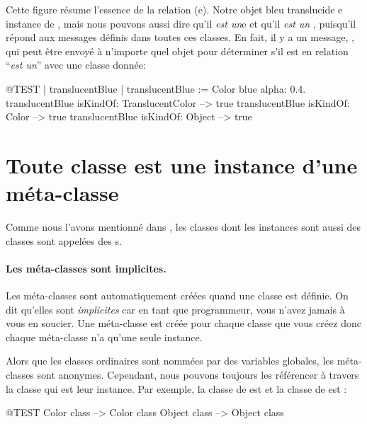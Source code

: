 \documentclass[a4paper,10pt,twoside]{book}
\begin{document}
Cette figure résume l'essence de la relation (e).
Notre objet bleu translucide e instance de
, mais nous pouvons aussi dire qu'il
\emph{est un}{}e   et qu'il \emph{est un} , puisqu'il répond aux messages définis dans toutes ces classes.
En fait, il y a un message, , qui peut être envoyé à n'importe quel objet pour déterminer s'il est en relation ``\emph{est un}'' avec une classe donnée:

\begin{code}{@TEST | translucentBlue |}
translucentBlue := Color blue alpha: 0.4.
translucentBlue isKindOf: TranslucentColor --> true
translucentBlue isKindOf: Color                    --> true
translucentBlue isKindOf: Object                  --> true
\end{code}

\section{Toute classe est une instance d'une méta-classe}


Comme nous l'avons mentionné dans , les classes dont les instances sont aussi des classes sont appelées des s.

\paragraph{Les méta-classes sont implicites.}
Les méta-classes sont automatiquement créées quand une classe est définie.
On dit qu'elles sont \emph{implicites} car en tant que programmeur, vous n'avez jamais à vous en soucier.
Une méta-classe  est créée pour chaque classe que vous créez donc chaque méta-classe n'a qu'une seule instance.

Alors que les classes ordinaires sont nommées par des variables globales, les méta-classes sont anonymes.
Cependant, nous pouvons toujours les référencer à travers la classe qui est leur instance.
Par exemple, la classe de  est  et la classe de  est :
\begin{code}{@TEST}
Color class   --> Color class
Object class --> Object class
\end{code}
\end{document}
